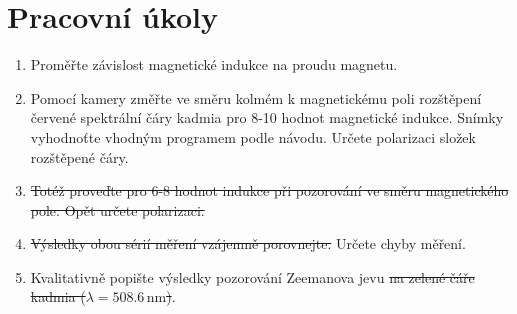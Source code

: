\documentclass[10pt,a4paper]{article}
\renewcommand{\U}[1]{\ensuremath{\,\mathrm{#1}}}
\newcommand{\°}{\degree}
\begin{document}

\setmainfont{Linux Libertine O}




\section{Pracovní úkoly}
\begin{enumerate}

    \item Proměřte závislost magnetické indukce na proudu magnetu.
    \item Pomocí kamery změřte ve směru kolmém k magnetickému poli rozštěpení červené spektrální čáry kadmia pro 8-10 hodnot magnetické indukce. Snímky vyhodnoťte vhodným programem podle návodu. Určete polarizaci složek rozštěpené čáry.
    \item \st{Totéž proveďte pro 6-8 hodnot indukce při pozorování ve směru magnetického pole. Opět určete polarizaci.}
    \item \st{Výsledky obou sérií měření vzájemně porovnejte.} Určete chyby měření.
    \item Kvalitativně popište výsledky pozorování Zeemanova jevu \st{na zelené čáře kadmia ($\lambda = 508.6 \U{nm}$)}.
\end{enumerate}
\end{document}

